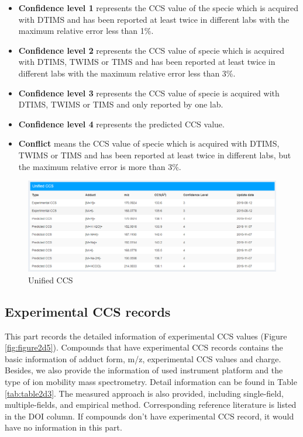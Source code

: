 \documentclass[12pt,]{book}
\providecommand{\tightlist}{%
  \setlength{\itemsep}{0pt}\setlength{\parskip}{0pt}}
\theoremstyle{definition}
\theoremstyle{definition}
\theoremstyle{definition}
\theoremstyle{remark}
\begin{document}
\begin{itemize}
\tightlist
\item
  \textbf{Confidence level 1} represents the CCS value of the specie
  which is acquired with DTIMS and has been reported at least twice in
  different labs with the maximum relative error less than 1\%.
\item
  \textbf{Confidence level 2} represents the CCS value of specie which
  is acquired with DTIMS, TWIMS or TIMS and has been reported at least
  twice in different labs with the maximum relative error less than 3\%.
\item
  \textbf{Confidence level 3} represents the CCS value of specie is
  acquired with DTIMS, TWIMS or TIMS and only reported by one lab.
\item
  \textbf{Confidence level 4} represents the predicted CCS value.
\item
  \textbf{Conflict} means the CCS value of specie which is acquired with
  DTIMS, TWIMS or TIMS and has been reported at least twice in different
  labs, but the maximum relative error is more than 3\%.
\end{itemize}

\begin{figure}

{\centering \includegraphics{images/chapter2/figure2.4unified_ccs} 

}

\caption{Unified CCS}\label{fig:figure2d4}
\end{figure}

\subsection{Experimental CCS records}\label{chapter2d2d3}

This part records the detailed information of experimental CCS values
(Figure \ref{fig:figure2d5}). Compounds that have experimental CCS
records contains the basic information of adduct form, m/z, experimental
CCS values and charge. Besides, we also provide the information of used
instrument platform and the type of ion mobility mass spectrometry.
Detail information can be found in Table \ref{tab:table2d3}. The
measured approach is also provided, including single-field,
multiple-fields, and empirical method. Corresponding reference
literature is listed in the DOI column. If compounds don't have
experimental CCS record, it would have no information in this part.
\end{document}
